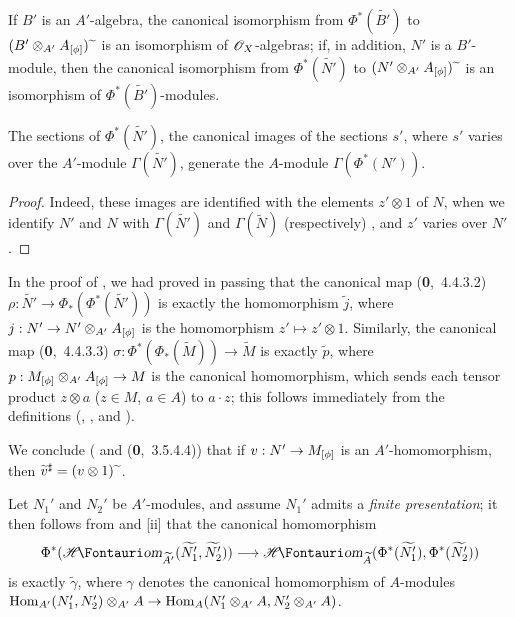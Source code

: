 If $B'$ is an $A'$-algebra, the canonical isomorphism from $\Phi^*(\widetilde{B'})$ to $(B'\otimes_{A'}A_{[\phi]}){\,\widetilde{\,}\,}$ is an isomorphism of $\mathscr{O}_X$-algebras;
if, in addition, $N'$ is a $B'$-module, then the canonical isomorphism from $\Phi^*(\widetilde{N'})$ to $(N'\otimes_{A'}A_{[\phi]}){\,\widetilde{\,}\,}$ is an isomorphism of $\Phi^*(\widetilde{B'})$-modules.

\begin{corollary}[1.6.6]
\label{I.1.6.6}
The sections of $\Phi^*(\widetilde{N'})$, the canonical images of the sections $s'$, where $s'$ varies over the $A'$-module $\Gamma(\widetilde{N'})$, generate the $A$-module $\Gamma(\Phi^*(N'))$.
\end{corollary}

\begin{proof}
Indeed, these images are identified with the elements $z'\otimes 1$ of $N$, when we identify $N'$ and $N$ with $\Gamma(\widetilde{N'})$ and $\Gamma(\widetilde{N})$ (respectively) , and $z'$ varies over $N'$.
\end{proof}

\begin{env}[1.6.7]
\label{I.1.6.7}
In the proof of , we had proved in passing that the canonical map (\textbf{0},~4.4.3.2) $\rho:\widetilde{N'}\to\Phi_*(\Phi^*(\widetilde{N'}))$ is exactly the homomorphism $\widetilde{j}$,
where $j:N'\to N'\otimes_{A'}A_{[\vphi]}$ is the homomorphism $z'\mapsto z'\otimes 1$.
Similarly, the canonical map (\textbf{0},~4.4.3.3) $\sigma:\Phi^*(\Phi_*(\widetilde{M}))\to\widetilde{M}$ is exactly $\widetilde{p}$, where $p:M_{[\vphi]}\otimes_{A'}A_{[\vphi]}\to M$ is the canonical homomorphism, which sends each tensor product $z\otimes a$ ($z\in M$, $a\in A$) to $a\cdot z$;
this follows immediately from the definitions (, , and ).

We conclude ( and (\textbf{0},~3.5.4.4)) that if $v:N'\to M_{[\vphi]}$ is an $A'$-homomorphism, then $\widetilde{v}^\sharp=(v\otimes 1){\,\widetilde{\,}\,}$.
\end{env}

\begin{env}[1.6.8]
\label{I.1.6.8}
Let $N_1'$ and $N_2'$ be $A'$-modules, and assume $N_1'$ admits a \emph{finite presentation};
it then follows from  and [ii] that the
canonical homomorphism 
\[
  \Phi^*(\shHom_{\widetilde{A'}}(\widetilde{N_1'},\widetilde{N_2'}))
  \to\shHom_{\widetilde{A}}(\Phi^*(\widetilde{N_1'}),\Phi^*(\widetilde{N_2'}))
\]
is exactly $\widetilde{\gamma}$, where $\gamma$ denotes the canonical homomorphism of $A$-modules $\Hom_{A'}(N_1',N_2')\otimes_{A'}A\to\Hom_A(N_1'\otimes_{A'}A,N_2'\otimes_{A'}A)$.
\end{env}

